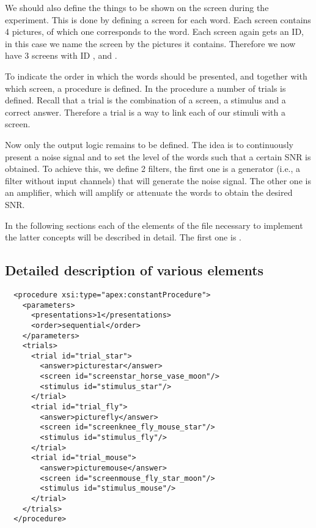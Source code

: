 We should also define the things to be shown on the screen during
the experiment. This is done by defining a screen for each word.
Each screen contains 4 pictures, of which one corresponds to the
word. Each screen again gets an ID, in this case we name the
screen by the pictures it contains. Therefore we now have 3
screens with ID ,
 and .

To indicate the order in which the words should be presented, and
together with which screen, a procedure is defined. In the
procedure a number of trials is defined. Recall that a trial is
the combination of a screen, a stimulus and a correct answer.
Therefore a trial is a way to link each of our stimuli with a
screen.

Now only the output logic remains to be defined. The idea is to
continuously present a noise signal and to set the level of the
words such that a certain SNR is obtained. To achieve this, we
define 2 filters, the first one is a generator (i.e., a filter
without input channels) that will generate the noise signal. The
other one is an amplifier, which will amplify or attenuate the
words to obtain the desired SNR.

In the following sections each of the elements of the 
file necessary to implement the latter concepts will be described
in detail. The first one is .

\subsection{Detailed description of various elements}
\begin{lstlisting}
  <procedure xsi:type="apex:constantProcedure">
    <parameters>
      <presentations>1</presentations>
      <order>sequential</order>
    </parameters>
    <trials>
      <trial id="trial_star">
        <answer>picturestar</answer>
        <screen id="screenstar_horse_vase_moon"/>
        <stimulus id="stimulus_star"/>
      </trial>
      <trial id="trial_fly">
        <answer>picturefly</answer>
        <screen id="screenknee_fly_mouse_star"/>
        <stimulus id="stimulus_fly"/>
      </trial>
      <trial id="trial_mouse">
        <answer>picturemouse</answer>
        <screen id="screenmouse_fly_star_moon"/>
        <stimulus id="stimulus_mouse"/>
      </trial>
    </trials>
  </procedure>
\end{lstlisting}

